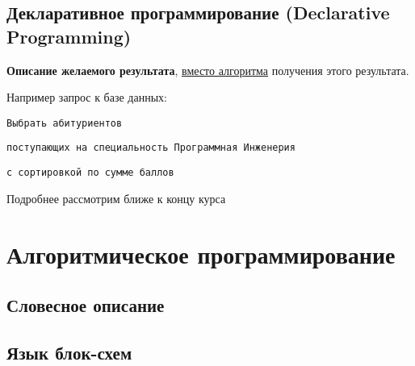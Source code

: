     \subsection{Декларативное программирование (Declarative Programming)}
    \begin{frame}
      \textbf{Описание желаемого результата}, \underline{вместо алгоритма} получения этого результата.\linebreak
        \vspace{1cm}

        Например запрос к базе данных:

        \vspace{0.5cm}
        \texttt{Выбрать абитуриентов}

        \texttt{поступающих на специальность Программная Инженерия}

        \texttt{с сортировкой по сумме баллов}
        \vspace{1cm}

        Подробнее рассмотрим ближе к концу курса
    \end{frame}


  \section{Алгоритмическое программирование}

    \subsection{Словесное описание}


    \subsection{Язык блок-схем}



